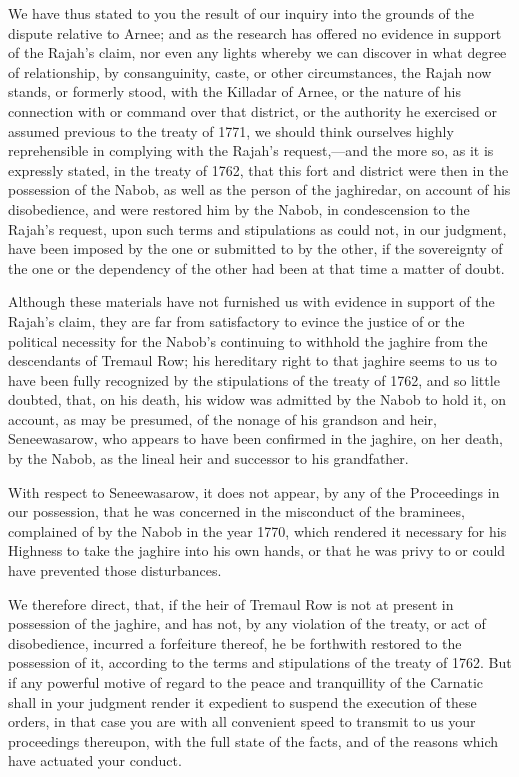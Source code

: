 We have thus stated to you the result of our inquiry into the grounds of the dispute relative to Arnee; and as the research has offered no evidence in support of the Rajah's claim, nor even any lights whereby we can discover in what degree of relationship, by consanguinity, caste, or other circumstances, the Rajah now stands, or formerly stood, with the Killadar of Arnee, or the nature of his connection with or command over that district, or the authority he exercised or assumed previous to the treaty of 1771, we should think ourselves highly reprehensible in complying with the Rajah's request,—and the more so, as it is expressly stated, in the treaty of 1762, that this fort and district were then in the possession of the Nabob, as well as the person of the jaghiredar, on account of his disobedience, and were restored him by the Nabob, in condescension to the Rajah's request, upon such terms and stipulations as could not, in our judgment, have been imposed by the one or submitted to by the other, if the sovereignty of the one or the dependency of the other had been at that time a matter of doubt.

Although these materials have not furnished us with evidence in support of the Rajah's claim, they are far from satisfactory to evince the justice of or the political necessity for the Nabob's continuing to withhold the jaghire from the descendants of Tremaul Row; his hereditary right to that jaghire seems to us to have been fully recognized by the stipulations of the treaty of 1762, and so little doubted, that, on his death, his widow was admitted by the Nabob to hold it, on account, as may be presumed, of the nonage of his grandson and heir, Seneewasarow, who appears to have been confirmed in the jaghire, on her death, by the Nabob, as the lineal heir and successor to his grandfather.

With respect to Seneewasarow, it does not appear, by any of the Proceedings in our possession, that he was concerned in the misconduct of the braminees, complained of by the Nabob in the year 1770, which rendered it necessary for his Highness to take the jaghire into his own hands, or that he was privy to or could have prevented those disturbances.

We therefore direct, that, if the heir of Tremaul Row is not at present in possession of the jaghire, and has not, by any violation of the treaty, or act of disobedience, incurred a forfeiture thereof, he be forthwith restored to the possession of it, according to the terms and stipulations of the treaty of 1762. But if any powerful motive of regard to the peace and tranquillity of the Carnatic shall in your judgment render it expedient to suspend the execution of these orders, in that case you are with all convenient speed to transmit to us your proceedings thereupon, with the full state of the facts, and of the reasons which have actuated your conduct.

